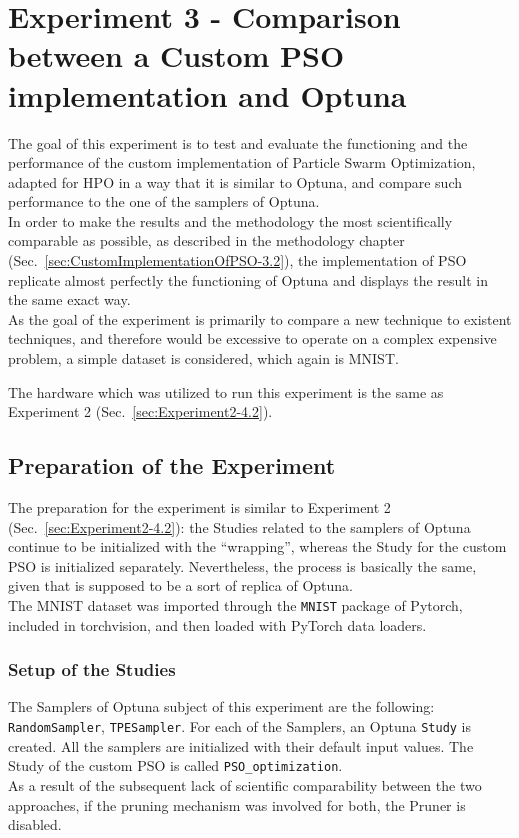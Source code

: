 \section{Experiment 3 - Comparison between a Custom PSO implementation and Optuna}

The goal of this experiment is to test and evaluate the functioning and the performance of the custom implementation of Particle Swarm Optimization, adapted for HPO in a way that it is similar to Optuna, and compare such performance to the one of the samplers of Optuna.
\\[0.3cm]In order to make the results and the methodology the most scientifically comparable as possible, as described in the methodology chapter (Sec.~\ref{sec:CustomImplementationOfPSO-3.2}), the implementation of PSO replicate almost perfectly the functioning of Optuna and displays the result in the same exact way.
\\[0.3cm]As the goal of the experiment is primarily to compare a new technique to existent techniques, and therefore would be excessive to operate on a complex expensive problem, a simple dataset is considered, which again is MNIST.

The hardware which was utilized to run this experiment is the same as Experiment 2 (Sec.~\ref{sec:Experiment2-4.2}).

\subsection{Preparation of the Experiment}

The preparation for the experiment is similar to Experiment 2 (Sec.~\ref{sec:Experiment2-4.2}): the Studies related to the samplers of Optuna continue to be initialized with the “wrapping”, whereas the Study for the custom PSO is initialized separately. Nevertheless, the process is basically the same, given that is supposed to be a sort of replica of Optuna. 
\\[0.3cm]The MNIST dataset was imported through the \texttt{MNIST} package of Pytorch, included in torchvision, and then loaded with PyTorch data loaders.

\subsubsection{Setup of the Studies}

The Samplers of Optuna subject of this experiment are the following: \texttt{RandomSampler}, \texttt{TPESampler}.
For each of the Samplers, an Optuna \texttt{Study} is created. All the samplers are initialized with their default input values.
The Study of the custom PSO is called \texttt{PSO\_optimization}.
\\[0.3cm]As a result of the subsequent lack of scientific comparability between the two approaches, if the pruning mechanism was involved for both, the Pruner is disabled.

